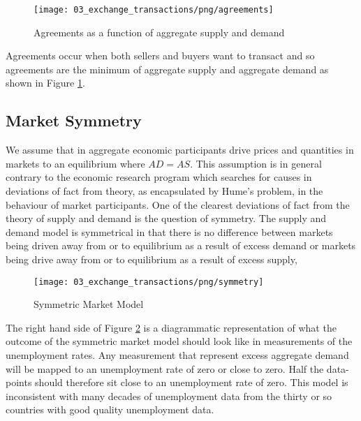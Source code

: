 \begin{figure}[H]
\centering
\texttt{[image: 03\_exchange\_transactions/png/agreements]}
\caption{Agreements as a function of aggregate supply and demand}
\label{fig:agreements}
\end{figure}

Agreements occur when both sellers and buyers want to transact and so agreements are the minimum of
aggregate supply and aggregate demand as shown in Figure \ref{fig:agreements}.

\subsection{Market Symmetry}

We assume that in aggregate economic participants drive prices and quantities in markets to an
equilibrium where $AD = AS$. This assumption is in general contrary to the economic research program
which searches for causes in deviations of fact from theory, as encapsulated by Hume's problem, in
the behaviour of market participants. One of the clearest deviations of fact from the theory of
supply and demand is the question of symmetry. The supply and demand model is symmetrical in that
there is no difference between markets being driven away from or to equilibrium as a result of
excess demand or markets being drive away from or to equilibrium as a result of excess supply, 

\begin{figure}[H]
\centering
\texttt{[image: 03\_exchange\_transactions/png/symmetry]}
\caption{Symmetric Market Model}
\label{fig:symmetric_market_model}
\end{figure}

The right hand side of Figure \ref{fig:symmetric_market_model} is a diagrammatic representation of
what the outcome of the symmetric market model should look like in measurements of the unemployment
rates. Any measurement that represent excess aggregate demand will be mapped to an unemployment rate
of zero or close to zero. Half the data-points should therefore sit close to an unemployment rate of
zero. This model is inconsistent with many decades of unemployment data from the thirty or so
countries with good quality unemployment data.

